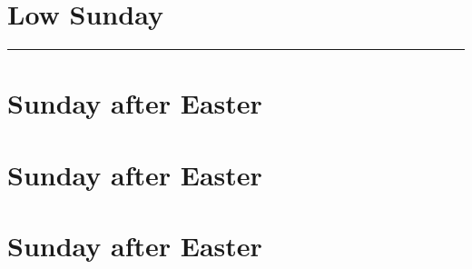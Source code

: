 {{
\section{Low Sunday}
\label{easter1}
\printcommonvespers[1]
\def\postchaptertitle{\label{easter1-chapter}}
\def\begincollectcols{\begin{parcolumns}[rulebetween,colwidths={1=0.42\linewidth}]{2}}
\def\postmagtitle{\label{easter1-mag}}

\def\commemorations{If the Feast of the Annunciation has been transferred to the Monday following Low Sunday, \emph{First Vespers} is commemorated as on page \pageref{annunciation-commem}.  If today is 30 April, 1 May, or 2 May, \emph{First Vespers of St Joseph the Worker} is commemorated as follows.}
\printcommemnote{}
}

\bigskip
\hrule
\medskip
{
\label{stjoseph-worker-commem}
\def\begincollectcols{\begin{parcolumns}[rulebetween,colwidths={1=0.43\linewidth}]{2}}
\def\vrlinebreak{T}

\bigskip
\benedicamusdomino{}
}

{
\section{ Sunday after Easter}
\label{easter2}
\printcommonvespers{}
\def\postchaptertitle{\label{easter2-chapter}}
\def\precollect{\printvrmanenobiscum}
\def\postmagtitle{\label{easter2-mag}}
\benedicamusdomino{}
}
{
\section{ Sunday after Easter}
\label{easter3}
\printcommonvespers{}
\def\postchaptertitle{\label{easter3-chapter}}
\def\begincollectcols{\begin{parcolumns}[rulebetween,colwidths={1=0.44\linewidth}]{2}}
\def\precollect{\printvrmanenobiscum}
\def\postmagtitle{\label{easter3-mag}}
\benedicamusdomino{}
}

{
\section{ Sunday after Easter}
\label{easter4}
\printcommonvespers{}
\def\postchaptertitle{\label{easter4-chapter}}
\def\precollect{\printvrmanenobiscum}
\def\postmagtitle{\label{easter4-mag}}
\benedicamusdomino{}
}

}
